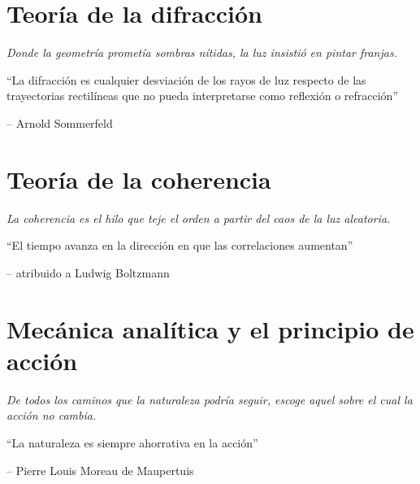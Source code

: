 \documentclass[spanish,11pt,twoside,openright]{book}
\begin{document}
	\frontmatter
	\tableofcontents
	\listoffigures
	
	\mainmatter
	\chapter{Teoría de la difracción}
	\thispagestyle{empty}
	\vspace*{2cm}
	\begin{center}
		{\itshape\Huge Donde la geometría prometía sombras nítidas, la luz insistió en pintar franjas. \par}
		\vspace{1cm}
		\epigraph{``La difracción es cualquier desviación de los rayos de luz respecto de las trayectorias rectilíneas que no pueda interpretarse como reflexión o refracción''}{-- Arnold Sommerfeld}
	\end{center}
	\clearpage

	

	\chapter{Teoría de la coherencia}\label{chap:Coherencia}
	\thispagestyle{empty}
	\vspace*{2cm}
	\begin{center}
		{\itshape\Huge La coherencia es el hilo que teje el orden a partir del caos de la luz aleatoria. \par}
		\vspace{1cm}
		\epigraph{``El tiempo avanza en la dirección en que las correlaciones aumentan''}{-- atribuido a Ludwig Boltzmann}
	\end{center}
	\clearpage

	

	\chapter{Mecánica analítica y el principio de acción}\label{chap:MecanicaAnalitica}
	\thispagestyle{empty}
	\vspace*{2cm}
	\begin{center}
		{\itshape\Huge De todos los caminos que la naturaleza podría seguir, escoge aquel sobre el cual la acción no cambia. \par}
		\vspace{1cm}
		\epigraph{``La naturaleza es siempre ahorrativa en la acción''}{-- Pierre Louis Moreau de Maupertuis}
	\end{center}
	\clearpage
\end{document}
